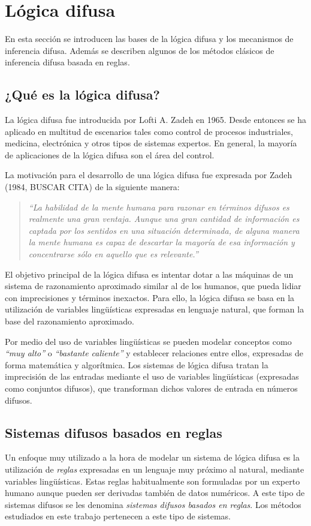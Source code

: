 \chapter{Lógica difusa}
\label{cha:logica-difusa}
En esta sección se introducen las bases de la lógica difusa y los mecanismos de inferencia difusa. Además se describen algunos de los métodos clásicos de inferencia difusa basada en reglas.

\section{¿Qué es la lógica difusa?}
La lógica difusa fue introducida por Lofti A. Zadeh en 1965. Desde entonces se ha aplicado en multitud de escenarios tales como control de procesos industriales, medicina, electrónica y otros tipos de sistemas expertos. En general, la mayoría de aplicaciones de la lógica difusa son el área del control.

La motivación para el desarrollo de una lógica difusa fue expresada por Zadeh (1984, BUSCAR CITA) de la siguiente manera:
\begin{quote}
\emph{``La habilidad de la mente humana para razonar en términos difusos es realmente una gran ventaja. Aunque una gran cantidad de información es captada por los sentidos en una situación determinada, de alguna manera la mente humana es capaz de descartar la mayoría de esa información y concentrarse sólo en aquello que es relevante.''}
\end{quote}
El objetivo principal de la lógica difusa es intentar dotar a las máquinas de un sistema de razonamiento aproximado similar al de los humanos, que pueda lidiar con imprecisiones y términos inexactos. Para ello, la lógica difusa se basa en la utilización de variables lingüísticas expresadas en lenguaje natural, que forman la base del razonamiento aproximado. 

Por medio del uso de variables lingüísticas se pueden modelar conceptos como \emph{``muy alto''} o \emph{``bastante caliente''} y establecer relaciones entre ellos, expresadas de forma matemática y algorítmica. Los sistemas de lógica difusa tratan la imprecisión de las entradas mediante el uso de variables lingüísticas (expresadas como conjuntos difusos), que transforman dichos valores de entrada en números difusos.

\section{Sistemas difusos basados en reglas}
Un enfoque muy utilizado a la hora de modelar un sistema de lógica difusa es la utilización de \emph{reglas} expresadas en un lenguaje muy próximo al natural, mediante variables lingüísticas. Estas reglas habitualmente son formuladas por un experto humano aunque pueden ser derivadas también de datos numéricos. A este tipo de sistemas difusos se les denomina \emph{sistemas difusos basados en reglas}. Los métodos estudiados en este trabajo pertenecen a este tipo de sistemas.

